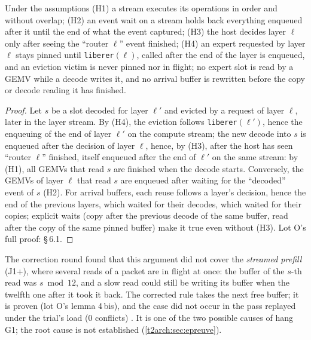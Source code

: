 \begin{lemme}\label{t2arch:lem:ordre}
Under the assumptions (H1) a stream executes its operations in order and without overlap; (H2) an event wait on a stream holds back everything enqueued after it until the end of what the event captured; (H3) the host decides layer $\ell$ only after seeing the ``router $\ell$'' event finished; (H4) an expert requested by layer $\ell$ stays pinned until \texttt{liberer}$(\ell)$, called after the end of the layer is enqueued, and an eviction victim is never pinned nor in flight; no expert slot is read by a GEMV while a decode writes it, and no arrival buffer is rewritten before the copy or decode reading it has finished.
\end{lemme}

\begin{proof}
Let $s$ be a slot decoded for layer $\ell'$ and evicted by a request of layer $\ell$, later in the layer stream. By (H4), the eviction follows \texttt{liberer}$(\ell')$, hence the enqueuing of the end of layer $\ell'$ on the compute stream; the new decode into $s$ is enqueued after the decision of layer $\ell$, hence, by (H3), after the host has seen ``router $\ell$'' finished, itself enqueued after the end of $\ell'$ on the same stream: by (H1), all GEMVs that read $s$ are finished when the decode starts. Conversely, the GEMVs of layer $\ell$ that read $s$ are enqueued after waiting for the ``decoded'' event of $s$ (H2). For arrival buffers, each reuse follows a layer's decision, hence the end of the previous layers, which waited for their decodes, which waited for their copies; explicit waits (copy after the previous decode of the same buffer, read after the copy of the same pinned buffer) make it true even without (H3). Lot O's full proof:  §\,6.1.
\end{proof}

The correction round found that this argument did not cover the \emph{streamed prefill} (J1+), where several reads of a packet are in flight at once: the buffer of the $s$-th read was $s \bmod 12$, and a slow read could still be writing its buffer when the twelfth one after it took it back. The corrected rule takes the next free buffer; it is proven (lot O's lemma 4\,bis), and the case did not occur in the pass replayed under the trial's load (0 conflicts) \mes. It is one of the two possible causes of hang G1; the root cause is not established (\cref{t2arch:sec:epreuve}).

